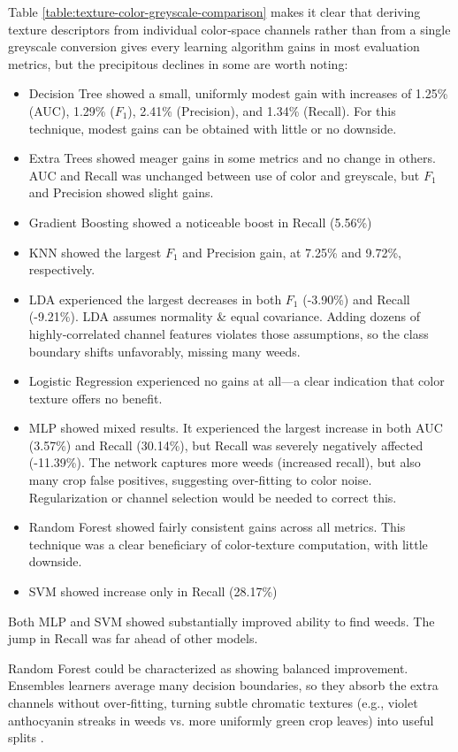 \documentclass[letterpaper, notitlepage]{report}
\begin{document}
Table \ref{table:texture-color-greyscale-comparison} makes it clear that deriving texture descriptors from individual color‑space channels rather than from a single greyscale conversion gives every learning algorithm gains in most evaluation metrics, but the precipitous declines in some are worth noting:
\begin{itemize}
	\item{Decision Tree showed a small, uniformly modest gain with increases of 1.25\% (AUC), 1.29\% (${F}_1$), 2.41\% (Precision), and 1.34\% (Recall). For this technique, modest gains can be obtained with little or no downside.}
	\item{Extra Trees showed meager gains in some metrics and no change in others. AUC and Recall was unchanged between use of color and greyscale, but ${F}_1$ and Precision showed slight gains.}
	\item{Gradient Boosting showed a noticeable boost in Recall (5.56\%)}
	\item{KNN showed the largest ${F}_1$ and Precision gain, at 7.25\% and 9.72\%, respectively.}
	\item{LDA experienced the largest decreases in both ${F}_1$ (-3.90\%) and Recall (-9.21\%). LDA assumes normality \& equal covariance. Adding dozens of highly‑correlated channel features violates those assumptions, so the class boundary shifts unfavorably, missing many weeds.}
	\item{Logistic Regression experienced no gains at all---a clear indication that color texture offers no benefit.}
	\item{MLP showed mixed results. It experienced the largest increase in both AUC (3.57\%) and Recall (30.14\%), but Recall was severely negatively affected (-11.39\%). The network captures more weeds (increased recall), but also many crop false positives, suggesting over-fitting to color noise. Regularization or channel selection would be needed to correct this.}
	\item{Random Forest showed fairly consistent gains across all metrics. This technique was a clear beneficiary of color-texture computation, with little downside.}
	\item{SVM showed increase only in Recall (28.17\%)}
\end{itemize}

Both \gls{MLP} and \gls{SVM} showed substantially improved ability to find weeds. The jump in Recall was far ahead of other models.

Random Forest could be characterized as showing balanced improvement. Ensembles learners average many decision boundaries, so they absorb the extra channels without over‑fitting, turning subtle chromatic textures (e.g., violet anthocyanin streaks in weeds vs. more uniformly green crop leaves) into useful splits \parencite{Burks2000-dt}.
\end{document}

